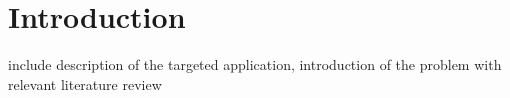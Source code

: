 \section{Introduction}
include description of the targeted application, introduction of the problem with relevant literature review 

